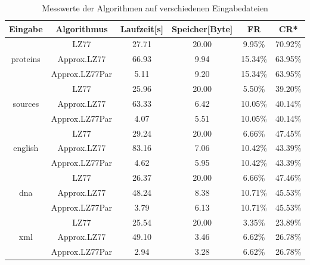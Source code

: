 \begin{table}[ht]
    \centering
    \caption{Messwerte der Algorithmen auf verschiedenen Eingabedateien}
    \begin{tabular} { |c|c|c|c|c|c| }
        \hline
        \textbf{Eingabe} & \textbf{Algorithmus} & \textbf{Laufzeit[s]} & \textbf{Speicher[Byte]} & \textbf{FR} & \textbf{CR*} \\
        \hline
        & LZ77 & 27.71 & 20.00 & 9.95\% & 70.92\% \\
        proteins & Approx.LZ77 & 66.93 & 9.94 & 15.34\% & 63.95\% \\
        & Approx.LZ77Par & 5.11 & 9.20 & 15.34\% & 63.95\% \\
        \hline
        & LZ77 & 25.96 & 20.00 & 5.50\% & 39.20\% \\
        sources & Approx.LZ77 & 63.33 & 6.42 & 10.05\% & 40.14\% \\
        & Approx.LZ77Par & 4.07 & 5.51 & 10.05\% & 40.14\% \\
        \hline
        & LZ77 & 29.24 & 20.00 & 6.66\% & 47.45\% \\
        english & Approx.LZ77 & 83.16 & 7.06 & 10.42\% & 43.39\% \\
        & Approx.LZ77Par & 4.62 & 5.95 & 10.42\% & 43.39\% \\
        \hline
        & LZ77 & 26.37 & 20.00 & 6.66\% & 47.46\% \\
        dna & Approx.LZ77 & 48.24 & 8.38 & 10.71\% & 45.53\% \\
        & Approx.LZ77Par & 3.79 & 6.13 & 10.71\% & 45.53\% \\
        \hline
        & LZ77 & 25.54 & 20.00 & 3.35\% & 23.89\% \\
        xml & Approx.LZ77 & 49.10 & 3.46 & 6.62\% & 26.78\% \\
        & Approx.LZ77Par & 2.94 & 3.28 & 6.62\% & 26.78\% \\
        \hline
    \end{tabular}
\end{table}
